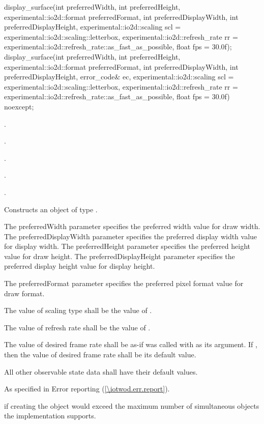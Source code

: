 %
\begin{itemdecl}
display_surface(int preferredWidth, int preferredHeight, 
  experimental::io2d::format preferredFormat,
  int preferredDisplayWidth, int preferredDisplayHeight,
  experimental::io2d::scaling scl = experimental::io2d::scaling::letterbox,
    experimental::io2d::refresh_rate rr =
    experimental::io2d::refresh_rate::as_fast_as_possible, float fps = 30.0f);
display_surface(int preferredWidth, int preferredHeight, 
  experimental::io2d::format preferredFormat,
  int preferredDisplayWidth, int preferredDisplayHeight, error_code& ec,
  experimental::io2d::scaling scl = experimental::io2d::scaling::letterbox,
    experimental::io2d::refresh_rate rr =
    experimental::io2d::refresh_rate::as_fast_as_possible, float fps = 30.0f) 
  noexcept;
\end{itemdecl}
\begin{itemdescr}
\pnum
\requires
{}.

\pnum
{}.

\pnum
{}.

\pnum
{}.

\pnum
{}.

\pnum
\effects
Constructs an object of type .

\pnum
The preferredWidth parameter specifies the preferred width value for draw width. The preferredDisplayWidth parameter specifies the preferred display width value for display width. The preferredHeight parameter specifies the preferred height value for draw height. The preferredDisplayHeight parameter specifies the preferred display height value for display height.

\pnum
The preferredFormat parameter specifies the preferred pixel format value for draw format.

\pnum
The value of scaling type shall be the value of .

\pnum
The value of refresh rate shall be the value of .

\pnum
The value of desired frame rate shall be as-if  was called with  as its argument. If , then the value of desired frame rate shall be its default value.

\pnum
All other observable state data shall have their default values.

\pnum
\throws
As specified in Error reporting (\ref{\iotwod.err.report}).

\pnum
\errors
{} if creating the  object would exceed the maximum number of simultaneous  objects the implementation supports.
\end{itemdescr}


